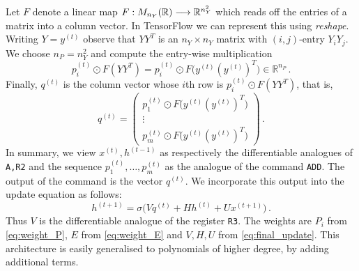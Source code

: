 \documentclass[english,letter paper,12pt,leqno]{article}
\theoremstyle{example}
\numberwithin{equation}{section}
\def\be{\begin{equation}}
\def\ee{\end{equation}}
\begin{document}
Let $F$ denote a linear map $F: M_{n_Y}(\mathbb{R}) \longrightarrow \mathbb{R}^{n_Y^2}$ which reads off the entries of a matrix into a column vector. In TensorFlow we can represent this using \emph{reshape}. Writing $Y = y^{(t)}$ observe that $Y Y^T$ is an $n_Y \times n_Y$ matrix with $(i,j)$-entry $Y_i Y_j$. We choose $n_P = n_Y^2$ and compute the entry-wise multiplication
\[
p^{(t)}_i \odot F(Y Y^T) = p^{(t)}_i \odot F\big( y^{(t)} ( y^{(t)} )^T \big) \in \mathbb{R}^{n_P}\,.
\]
Finally, $q^{(t)}$ is the column vector whose $i$th row is $p^{(t)}_i \odot F(Y Y^T)$, that is,
\[
q^{(t)} = \begin{pmatrix} p^{(t)}_1 \odot F\big( y^{(t)} ( y^{(t)} )^T \big) \\
\vdots\\
p^{(t)}_m \odot F\big( y^{(t)} ( y^{(t)} )^T \big) \end{pmatrix}\,.
\] 
In summary, we view $x^{(t)}, h^{(t-1)}$ as respectively the differentiable analogues of \verb+A,R2+ and the sequence $p^{(t)}_1, \ldots, p^{(t)}_m$ as the analogue of the command \verb+ADD+. The output of the command is the vector $q^{(t)}$. We incorporate this output into the update equation as follows:
\be\label{eq:final_update}
h^{(t+1)} = \sigma\big( V q^{(t)} + H h^{(t)} + U x^{(t+1)} \big)\,.
\ee
Thus $V$ is the differentiable analogue of the register \verb+R3+. The weights are $P_i$ from \eqref{eq:weight_P}, $E$ from \eqref{eq:weight_E} and $V, H, U$ from \eqref{eq:final_update}. This architecture is easily generalised to polynomials of higher degree, by adding additional terms.
\end{document}
